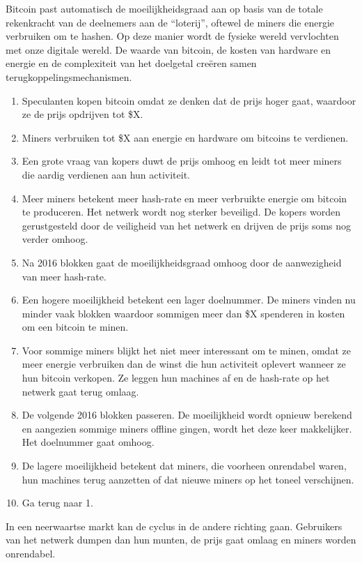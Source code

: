Bitcoin past automatisch de moeilijkheidsgraad aan op basis van de totale rekenkracht van de deelnemers aan de ``loterij'', oftewel de miners die energie verbruiken om te hashen. Op deze manier wordt de fysieke wereld vervlochten met onze digitale wereld. De waarde van bitcoin, de kosten van hardware en energie en de complexiteit van het doelgetal creëren samen terugkoppelingsmechanismen.

\begin{enumerate}
\item Speculanten kopen bitcoin omdat ze denken dat de prijs hoger gaat, waardoor ze de prijs opdrijven tot \$X.
\item Miners verbruiken tot \$X aan energie en hardware om bitcoins te verdienen.
\item Een grote vraag van kopers duwt de prijs omhoog en leidt tot meer miners die aardig verdienen aan hun activiteit.
\item Meer miners betekent meer hash-rate en meer verbruikte energie om bitcoin te produceren. Het netwerk wordt nog sterker beveiligd. De kopers worden gerustgesteld door de veiligheid van het netwerk en drijven de prijs soms nog verder omhoog.
\item Na 2016 blokken gaat de moeilijkheidsgraad omhoog door de aanwezigheid van meer hash-rate.
\item Een hogere moeilijkheid betekent een lager doelnummer. De miners vinden nu minder vaak blokken waardoor sommigen meer dan \$X spenderen in kosten om een bitcoin te minen.
\item Voor sommige miners blijkt het niet meer interessant om te minen, omdat ze meer energie verbruiken dan de winst die hun activiteit oplevert wanneer ze hun bitcoin verkopen. Ze leggen hun machines af en de hash-rate op het netwerk gaat terug omlaag.
\item De volgende 2016 blokken passeren. De moeilijkheid wordt opnieuw berekend en aangezien sommige miners offline gingen, wordt het deze keer makkelijker. Het doelnummer gaat omhoog.
\item De lagere moeilijkheid betekent dat miners, die voorheen onrendabel waren, hun machines terug aanzetten of dat nieuwe miners op het toneel verschijnen.
\item Ga terug naar 1.
\end{enumerate}
In een neerwaartse markt kan de cyclus in de andere richting gaan. Gebruikers van het netwerk dumpen dan hun munten, de prijs gaat omlaag en miners worden onrendabel.

